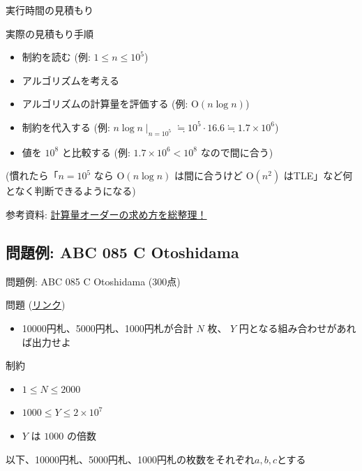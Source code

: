 \documentclass[dvipdfmx]{beamer}
\begin{document}
\begin{frame}{実行時間の見積もり}
  \begin{block}{実際の見積もり手順}
    \begin{itemize}
      \item 制約を読む (例: $1 \le n \le 10^5$)
      \item アルゴリズムを考える
      \item アルゴリズムの計算量を評価する (例: $\mathrm{O}(n\log n)$)
      \item 制約を代入する (例: $n \log n \mid_{n=10^5} \fallingdotseq 10^5 \cdot 16.6 \fallingdotseq 1.7 \times 10^6$)
      \item 値を $10^8$ と比較する (例: $1.7 \times 10^6 < 10^8$ なので間に合う)
    \end{itemize}
  \end{block}

  (慣れたら「$n=10^5$ なら $\mathrm{O}(n\log n)$ は間に合うけど $\mathrm{O}(n^2)$ はTLE」など何となく判断できるようになる)

  参考資料: {\small \href{https://qiita.com/drken/items/872ebc3a2b5caaa4a0d0}{計算量オーダーの求め方を総整理！}}
\end{frame}

\subsection{問題例: ABC 085 C Otoshidama}

\begin{frame}{問題例: ABC 085 C Otoshidama (300点)}
  \begin{block}{問題 (\href{https://beta.atcoder.jp/contests/abc085/tasks/abc085_c}{リンク})}
    \begin{itemize}
      \item 10000円札、5000円札、1000円札が合計 $N$ 枚、 $Y$ 円となる組み合わせがあれば出力せよ
    \end{itemize}
  \end{block}
  \begin{block}{制約}
    \begin{itemize}
      \item $1 \le N \le 2000$
      \item $1000 \le Y \le 2 \times 10^7$
      \item $Y$ は $1000$ の倍数
    \end{itemize}
  \end{block}
  以下、10000円札、5000円札、1000円札の枚数をそれぞれ$a,b,c$とする
\end{frame}
\end{document}
